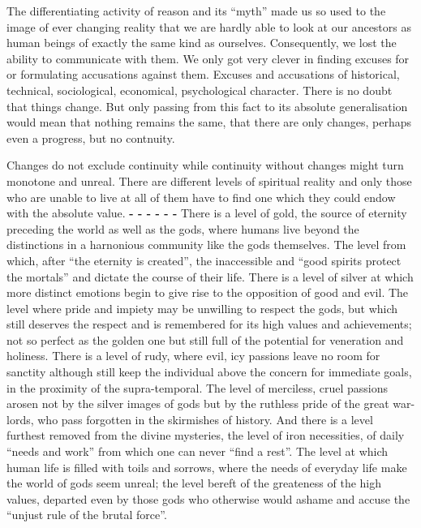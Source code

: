 The differentiating activity of reason and its ``myth'' made us so 
used to the image of ever changing reality that we are hardly able to look at
our ancestors as human beings of exactly the same kind as ourselves. 
Consequently, we lost the ability to communicate with them. We only 
got very clever in finding excuses for or formulating accusations against them.
Excuses and accusations of historical, technical, sociological, economical, 
psychological character. There is no doubt that things change. But only passing
from this fact to its absolute generalisation would mean that nothing remains 
the same, that there are only changes, perhaps even a progress, but no 
contnuity. 

Changes do not exclude continuity while continuity
without changes might turn monotone and unreal. 
There are different levels of spiritual
reality and only those who are unable to live at all of them have to find one
which they could endow with the absolute value.
{\Large \bf - - - - - - } 
There is a level of gold, the source of eternity preceding the world as well as the gods,
where humans live beyond the distinctions in a harnonious community like the gods 
themselves. The  level from which, after ``the eternity is created'',
the inaccessible and ``good spirits protect the mortals'' and dictate the course of their 
life.
There is a level of silver at which more distinct emotions begin to give rise to the 
opposition of good and evil. The level where pride and impiety may be unwilling to respect
the gods, but which still deserves the respect and is remembered for its high values and
 achievements; not so perfect as the golden one but still full of the potential for 
veneration and holiness.
There is a level of rudy, where evil, icy passions leave no room for sanctity although
still keep the individual above the concern for immediate goals, in the proximity of 
the supra-temporal. The level of merciless, cruel passions arosen not by the silver 
images of gods but by the ruthless pride of the great war-lords, who pass 
forgotten in the skirmishes of history. 
And there is a level furthest removed from the divine mysteries, the
level of iron necessities, of daily ``needs and work'' from which
one can never ``find a rest''. The level at which human life is filled with toils and 
sorrows, where the needs of everyday life make the world of gods seem unreal;
the level bereft of the greateness of the high values, departed even by those gods who 
otherwise would ashame and accuse the ``unjust rule of the brutal force''.


